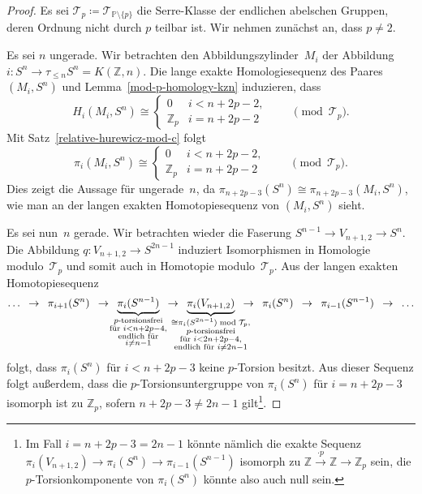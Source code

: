 \documentclass[11pt, a4paper, german]{article}
\theoremstyle{definition}
\theoremstyle{remark}
\newcommand{\R}{\mathbb{R}} %
\newcommand{\Z}{\mathbb{Z}} %
\newcommand{\T}{\mathcal{T}} %
\newcommand{\V}[2]{V_{{#2},{#1}}} %
\newcommand{\Primes}{\mathbb{P}} %
\begin{document}
\begin{proof}
  Es sei $\T_p \coloneqq \T_{\Primes \setminus \{ p \}}$ die Serre-Klasse der endlichen abelschen Gruppen, deren Ordnung nicht durch $p$ teilbar ist.
  Wir nehmen zunächst an, dass $p \neq 2$.

  Es sei $n$ ungerade.
  Wir betrachten den Abbildungszylinder~$M_i$ der Abbildung $i : S^n \to \tau_{\leq n} S^n = K(\Z, n)$.
  Die lange exakte Homologiesequenz des Paares $(M_i, S^n)$ und Lemma~\ref{mod-p-homology-kzn} induzieren, dass
  \[
   H_i(M_i, S^n) \cong \begin{cases}
     0 & i < n + 2p - 2, \\
     \Z_p & i = n + 2p - 2
   \end{cases}
   \qquad \pmod{\T_p}.
  \]
  Mit Satz~\ref{relative-hurewicz-mod-c} folgt
  \[
   \pi_i(M_i, S^n) \cong \begin{cases}
     0 & i < n + 2p - 2, \\
     \Z_p & i = n + 2p - 2
   \end{cases}
   \qquad \pmod{\T_p}.
  \]
  Dies zeigt die Aussage für ungerade~$n$, da $\pi_{n+2p-3}(S^n) \cong \pi_{n+2p-3}(M_i, S^n)$, wie man an der langen exakten Homotopiesequenz von $(M_i, S^n)$ sieht.

  Es sei nun~$n$ gerade.
  Wir betrachten wieder die Faserung $S^{n-1} \to \V{2}{n+1} \to S^n$.
  Die Abbildung $q : \V{2}{n+1} \to S^{2n-1}$ induziert Isomorphismen in Homologie modulo~$\T_p$ und somit auch in Homotopie modulo~$\T_p$.
  Aus der langen exakten Homotopiesequenz
  \[
    \ldots
    \enspace\to\enspace
    \pi_{i+1}(S^n)
    \enspace\to\enspace
    \underbrace{\pi_i(S^{n-1})}_{\mathclap{\substack{\text{$p$-torsionsfrei} \\ \text{für } i < n + 2p - 4, \\ \text{endlich für} \\ i \neq n-1}}}
    \enspace\to\enspace \underbrace{\pi_i(\V{2}{n+1})}_{\mathclap{\substack{\cong \pi_i(S^{2n-1}) \bmod{\T_p}, \\ \text{$p$-torsionsfrei} \\ \text{für } i < 2n + 2p - 4, \\ \text{endlich für } i \neq 2n-1}}}
    \enspace\to\enspace
    \pi_i(S^n)
    \enspace\to\enspace
    \pi_{i-1}(S^{n-1})
    \enspace\to\enspace
    \ldots
  \]
  folgt, dass $\pi_i(S^n)$ für $i < n + 2p - 3$ keine $p$-Torsion besitzt.
  Aus dieser Sequenz folgt außerdem, dass die $p$-Torsionsuntergruppe von $\pi_i(S^n)$ für $i = n + 2p - 3$ isomorph ist zu $\Z_p$, sofern $n + 2p - 3 \neq 2n - 1$ gilt\footnote{Im Fall $i = n + 2p - 3 = 2n - 1$ könnte nämlich die exakte Sequenz $\pi_i(\V{2}{n+1}) \to \pi_i(S^n) \to \pi_{i-1}(S^{n-1})$ isomorph zu $\Z \xrightarrow{\cdot p} \Z \to \Z_p$ sein, die $p$-Torsionkomponente von $\pi_i(S^n)$ könnte also auch null sein.}.
  

\end{proof}
\end{document}
